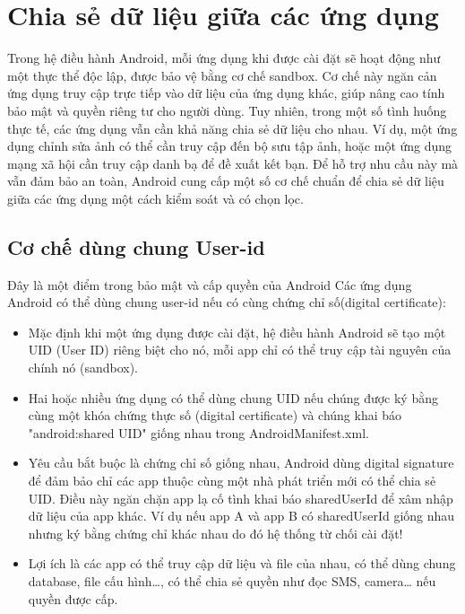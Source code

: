 \section{Chia sẻ dữ liệu giữa các ứng dụng}

  Trong hệ điều hành Android, mỗi ứng dụng khi được cài đặt sẽ hoạt động như một thực thể độc lập, được bảo vệ bằng cơ chế sandbox. Cơ chế này ngăn cản ứng dụng truy cập trực tiếp vào dữ liệu của ứng dụng khác, giúp nâng cao tính bảo mật và quyền riêng tư cho người dùng. Tuy nhiên, trong một số tình huống thực tế, các ứng dụng vẫn cần khả năng chia sẻ dữ liệu cho nhau. Ví dụ, một ứng dụng chỉnh sửa ảnh có thể cần truy cập đến bộ sưu tập ảnh, hoặc một ứng dụng mạng xã hội cần truy cập danh bạ để đề xuất kết bạn. Để hỗ trợ nhu cầu này mà vẫn đảm bảo an toàn, Android cung cấp một số cơ chế chuẩn để chia sẻ dữ liệu giữa các ứng dụng một cách kiểm soát và có chọn lọc.

\subsection{Cơ chế dùng chung User-id}
\renewcommand{\labelitemi}{--}    
        Đây là một điểm trong bảo mật và cấp quyền của Android Các ứng dụng Android có thể dùng chung user-id nếu có cùng chứng chỉ số(digital certificate):
        \setlength{\leftmargini}{1.5cm}
        \begin{itemize}
            \item Mặc định khi một ứng dụng được cài đặt, hệ điều hành Android sẽ tạo một UID (User ID) riêng biệt cho nó, mỗi app chỉ có thể truy cập tài nguyên của chính nó (sandbox).
            \item Hai hoặc nhiều ứng dụng có thể dùng chung UID nếu chúng được ký bằng cùng một khóa chứng thực số (digital certificate) và chúng khai báo "android:shared UID" giống nhau trong AndroidManifest.xml.
            \item Yêu cầu bắt buộc là chứng chỉ số giống nhau, Android dùng digital signature để đảm bảo chỉ các app thuộc cùng một nhà phát triển mới có thể chia sẻ UID. Điều này ngăn chặn app lạ cố tình khai báo sharedUserId để xâm nhập dữ liệu của app khác.
            Ví dụ nếu app A và app B có sharedUserId giống nhau nhưng ký bằng chứng chỉ khác nhau do đó hệ thống từ chối cài đặt!
            \item Lợi ích là các app có thể truy cập dữ liệu và file của nhau, có thể dùng chung database, file cấu hình…, có thể chia sẻ quyền như đọc SMS, camera… nếu quyền được cấp.
        \end{itemize}
